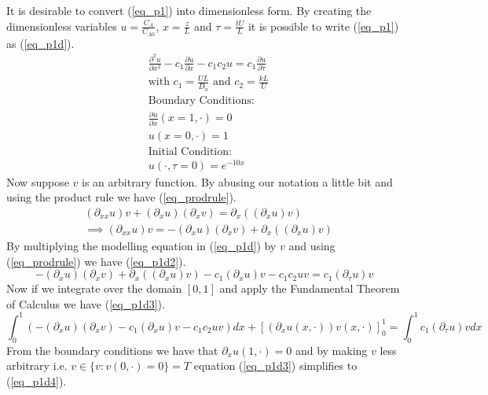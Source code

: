\documentclass[11pt,fleqn]{article}
\theoremstyle{defstyle}
\begin{document}
It is desirable to convert (\ref{eq_p1}) into dimensionless form. By creating the dimensionless variables $u=\frac{C_A}{C_{A0}}$, $x = \frac{z}{L}$ and $\tau = \frac{tU}{L}$ it is possible to write (\ref{eq_p1}) as (\ref{eq_p1d}).
\begin{equation}
\begin{aligned}
&\frac{\partial^2 u}{\partial x^2} - c_1 \frac{\partial u}{\partial x} - c_1c_2u = 
c_1\frac{\partial u}{\partial \tau} \\
&\text{with } c_1 = \frac{UL}{D_a} \text{ and } c_2 = \frac{kL}{U} \\
&\text{Boundary Conditions:} \\
&\frac{\partial u}{\partial x}(x=1, \cdot) = 0\\
&u(x=0, \cdot) = 1 \\
&\text{Initial Condition:} \\
& u(\cdot, \tau = 0) = e^{-10x}
\end{aligned}
\label{eq_p1d}
\end{equation}
Now suppose $v$ is an arbitrary function. By abusing our notation a little bit and using the product rule we have (\ref{eq_prodrule}).
\begin{equation}
\begin{aligned}
&(\partial_{xx}u)v + (\partial_xu)(\partial_xv) = \partial_x( (\partial_xu)v)\\
&\implies (\partial_{xx}u)v = -(\partial_xu)(\partial_xv) + \partial_x( (\partial_xu)v)
\end{aligned}
\label{eq_prodrule}
\end{equation}
By multiplying the modelling equation in (\ref{eq_p1d}) by $v$ and using (\ref{eq_prodrule}) we have (\ref{eq_p1d2}).
\begin{equation}
 -(\partial_xu)(\partial_xv) + \partial_x( (\partial_xu)v) - c_1(\partial_xu)v - c_1c_2uv = c_1(\partial_{\tau}u)v 
\label{eq_p1d2}
\end{equation}
Now if we integrate over the domain $[0, 1]$ and apply the Fundamental Theorem of Calculus we have (\ref{eq_p1d3}).
\begin{equation}
\int_0^1 (-(\partial_xu)(\partial_xv) - c_1(\partial_xu)v - c_1c_2uv)dx + [(\partial_xu(x, \cdot))v(x, \cdot)]^1_0 = \int^1_0 c_1(\partial_{\tau}u)v dx
\label{eq_p1d3}
\end{equation}
From the boundary conditions we have that $\partial_xu(1,\cdot)=0$ and by making $v$ less arbitrary i.e. $v \in \{v : v(0, \cdot)=0 \} = T$ equation (\ref{eq_p1d3}) simplifies to (\ref{eq_p1d4}).
\end{document}
